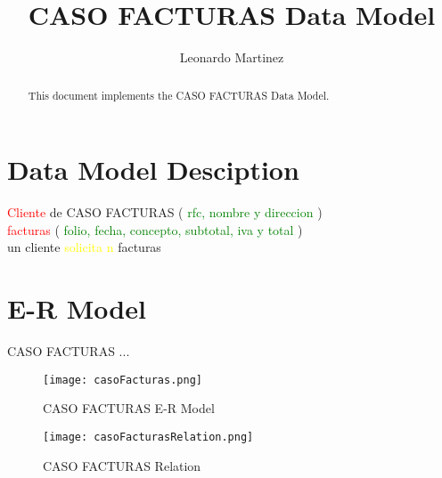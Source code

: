 \documentclass[10pt]{article}         %
\title{CASO FACTURAS Data Model}
\author{Leonardo Martinez}
\begin{document}
\maketitle

\begin{abstract}
This document implements the CASO FACTURAS Data Model.
\end{abstract}

\section{Data Model Desciption}


\textcolor{red}{Cliente} de CASO FACTURAS ( \textcolor{green}{ rfc, nombre y direccion} )\\

\textcolor{red}{facturas} ( \textcolor{green}{folio, fecha, concepto, subtotal, iva y total} )\\

un cliente  \textcolor{yellow}{solicita n} facturas

\section{E-R Model}

CASO FACTURAS ...
\begin{figure}[h]
     \texttt{[image: casoFacturas.png]}
     \caption{CASO FACTURAS E-R Model}
\end{figure}



\begin{figure}[h]
     \texttt{[image: casoFacturasRelation.png]}
     \caption{CASO FACTURAS Relation}
\end{figure}
\end{document}
